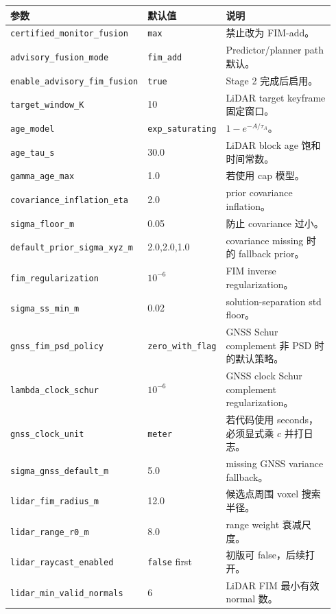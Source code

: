 \documentclass[11pt,a4paper]{article}
\begin{document}
\begin{center}
\small
\begin{longtable}{@{}P{0.34\linewidth}P{0.18\linewidth}P{0.42\linewidth}@{}}
  \toprule
  \textbf{参数} & \textbf{默认值} & \textbf{说明} \\
  \midrule
  \texttt{certified\_monitor\_fusion} & \texttt{max} & 禁止改为 FIM-add。\\
  \texttt{advisory\_fusion\_mode} & \texttt{fim\_add} & Predictor/planner path 默认。\\
  \texttt{enable\_advisory\_fim\_fusion} & \texttt{true} & Stage 2 完成后启用。\\
  \texttt{target\_window\_K} & 10 & LiDAR target keyframe 固定窗口。\\
  \texttt{age\_model} & \texttt{exp\_saturating} & $1-e^{-A/\tau_A}$。\\
  \texttt{age\_tau\_s} & 30.0 & LiDAR block age 饱和时间常数。\\
  \texttt{gamma\_age\_max} & 1.0 & 若使用 cap 模型。\\
  \texttt{covariance\_inflation\_eta} & 2.0 & prior covariance inflation。\\
  \texttt{sigma\_floor\_m} & 0.05 & 防止 covariance 过小。\\
  \texttt{default\_prior\_sigma\_xyz\_m} & 2.0,2.0,1.0 & covariance missing 时的 fallback prior。\\
  \texttt{fim\_regularization} & $10^{-6}$ & FIM inverse regularization。\\
  \texttt{sigma\_ss\_min\_m} & 0.02 & solution-separation std floor。\\
  \texttt{gnss\_fim\_psd\_policy} & \texttt{zero\_with\_flag} & GNSS Schur complement 非 PSD 时的默认策略。\\
  \texttt{lambda\_clock\_schur} & $10^{-6}$ & GNSS clock Schur complement regularization。\\
  \texttt{gnss\_clock\_unit} & \texttt{meter} & 若代码使用 seconds，必须显式乘 $c$ 并打日志。\\
  \texttt{sigma\_gnss\_default\_m} & 5.0 & missing GNSS variance fallback。\\
  \texttt{lidar\_fim\_radius\_m} & 12.0 & 候选点周围 voxel 搜索半径。\\
  \texttt{lidar\_range\_r0\_m} & 8.0 & range weight 衰减尺度。\\
  \texttt{lidar\_raycast\_enabled} & \texttt{false} first & 初版可 false，后续打开。\\
  \texttt{lidar\_min\_valid\_normals} & 6 & LiDAR FIM 最小有效 normal 数。\\

\end{longtable}
\end{center}
\end{document}
